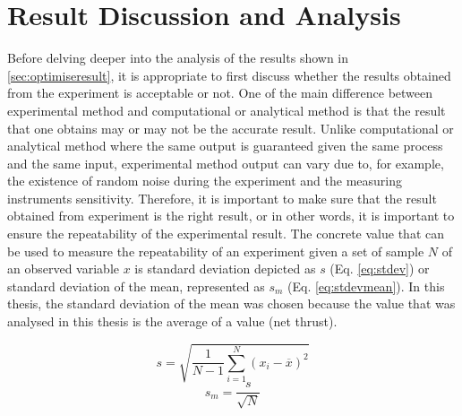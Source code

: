 \section{Result Discussion and Analysis}
\label{sec:discuss}
Before delving deeper into the analysis of the results shown in \ref{sec:optimiseresult}, it is appropriate to first discuss whether the results obtained from the experiment is acceptable or not. One of the main difference between experimental method and computational or analytical method is that the result that one obtains may or may not be the accurate result. Unlike computational or analytical method where the same output is guaranteed given the same process and the same input, experimental method output can vary due to, for example, the existence of random noise during the experiment and the measuring instruments sensitivity. Therefore, it is important to make sure that the result obtained from experiment is the right result, or in other words, it is important to ensure the repeatability of the experimental result. The concrete value that can be used to measure the repeatability of an experiment given a set of sample $N$ of an observed variable $x$ is standard deviation depicted as $s$ (Eq. \ref{eq:stdev}) or standard deviation of the mean, represented as $s_{m}$ (Eq. \ref{eq:stdevmean}). In this thesis, the standard deviation of the mean was chosen because the value that was analysed in this thesis is the average of a value (net thrust).\par
\begin{equation}
    s = \sqrt{\frac{1}{N-1} \sum_{i=1}^N (x_i - \overline{x})^2}
    \label{eq:stdev}
\end{equation}
\begin{equation}
    s_{m} = \frac{s}{\sqrt{N}}
   \label{eq:stdevmean}
\end{equation}
